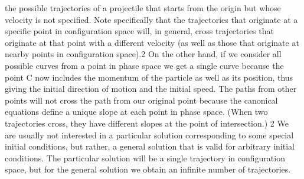the possible trajectories of a projectile that starts from the origin but whose
velocity is not specified. Note specifically that the trajectories that originate at
a specific point in configuration space will, in general, cross trajectories that
originate at that point with a different velocity (as well as those that originate
at nearby points in configuration space).2
On the other hand, if we consider all possible curves from a point in phase
space we get a single curve because the point C now includes the momentum
of the particle as well as its position, thus giving the initial direction of motion
and the initial speed. The paths from other points will not cross the path from
our original point because the canonical equations define a unique slope at each
point in phase space. (When two trajectories cross, they have different slopes
at the point of intersection.)
2 We are usually not interested in a particular solution corresponding to some special initial
conditions, but rather, a general solution that is valid for arbitrary initial conditions. The
particular solution will be a single trajectory in configuration space, but for the general
solution we obtain an infinite number of trajectories.

